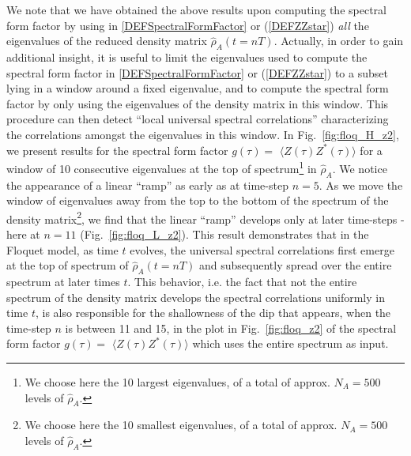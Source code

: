 \documentclass[aps,prb,preprint,onecolumn,amsmath,amssymb,superscriptaddress,eqsecnum,floatfix,scrartcl]{revtex4-1}
\begin{document}
We note that we have obtained the above results
upon computing the  spectral form factor by using in  \eqref{DEFSpectralFormFactor}
or (\ref{DEFZZstar}) 
{\it all}  the eigenvalues 
of the reduced density matrix ${\hat \rho}_A(t=n T)$.
Actually, 
in order to gain additional insight,
it is useful to
 limit the eigenvalues
used to compute the spectral form factor in \eqref{DEFSpectralFormFactor} 
or (\ref{DEFZZstar}) 
to 
a subset lying in a  
window around a fixed 
eigenvalue, and to compute the spectral form factor
by only using 
the eigenvalues of the density matrix in this window.
This procedure can then detect 
``local universal spectral correlations''
characterizing the correlations  amongst the 
eigenvalues in this
window.
 In Fig.~\ref{fig:floq_H_z2}, we present results for the
 spectral form factor $g(\tau)=$ $\langle Z(\tau)Z^*(\tau)\rangle$ for a window of 10 consecutive eigenvalues at the top of 
spectrum\footnote{
We choose here the 10 largest eigenvalues, of a total of approx. $N_A=500$ levels of ${\hat \rho}_A$.
}
 in ${\hat \rho}_A$.
We  notice the appearance of a linear ``ramp'' as early as at time-step $n=5$. 
As we move the window of eigenvalues
 away from the top to the bottom of the spectrum of the density 
matrix\footnote{We choose here the 10 smallest eigenvalues, of a total of approx. $N_A=500$
levels of ${\hat \rho}_A$.
}, 
we find that the linear ``ramp'' develops only  at  later time-steps
- here at $n=11$  (Fig.~\ref{fig:floq_L_z2}).
 This result demonstrates that in the Floquet model, as time $t$  evolves,
the universal spectral  correlations
first  emerge  at the top of spectrum of ${\hat \rho}_A(t=nT)$ and 
subsequently spread over the
entire  spectrum at  later times $t$. 
This behavior, i.e. the fact that not the entire spectrum of the density matrix develops
the spectral correlations
uniformly in time $t$,  is also responsible for the  shallowness of the dip that appears,
when the time-step  $n$ is between 11 and 15,
in  the plot in Fig.~\ref{fig:floq_z2}
of  the spectral form factor 
$g(\tau)=$ $\langle Z(\tau)Z^*(\tau)\rangle$ 
which uses the entire
spectrum as input.
\end{document}
